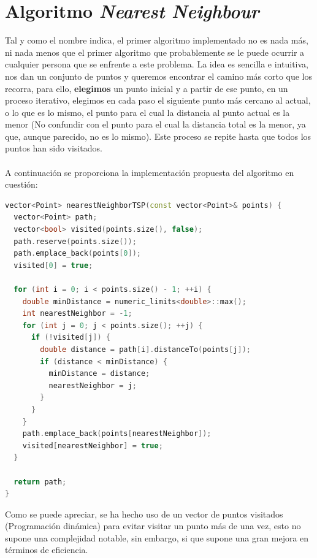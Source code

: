 \documentclass[11pt,openany]{book}
\begin{document}
\section{Algoritmo \textit{Nearest Neighbour}}
Tal y como el nombre indica, el primer algoritmo implementado no es nada más, ni 
nada menos que el primer algoritmo que probablemente se le puede ocurrir a cualquier
persona que se enfrente a este problema. La idea es sencilla e intuitiva, nos 
dan un conjunto de puntos y queremos encontrar el camino más corto que los recorra,
para ello, \textbf{elegimos} un punto inicial y a partir de ese punto, en un proceso 
iterativo, elegimos en cada paso el siguiente punto más cercano al actual, o lo que 
es lo mismo, el punto para el cual la distancia al punto actual es la menor (No confundir
con el punto para el cual la distancia total es la menor, ya que, aunque parecido, no es 
lo mismo). Este proceso se repite hasta que todos los puntos han sido visitados.
\\ \\
A continuación se proporciona la implementación propuesta del algoritmo en cuestión:
\begin{lstlisting}[language=C++]
vector<Point> nearestNeighborTSP(const vector<Point>& points) {
  vector<Point> path;
  vector<bool> visited(points.size(), false);
  path.reserve(points.size());
  path.emplace_back(points[0]);
  visited[0] = true;

  for (int i = 0; i < points.size() - 1; ++i) {
    double minDistance = numeric_limits<double>::max();
    int nearestNeighbor = -1;
    for (int j = 0; j < points.size(); ++j) {
      if (!visited[j]) {
        double distance = path[i].distanceTo(points[j]);
        if (distance < minDistance) {
          minDistance = distance;
          nearestNeighbor = j;
        }
      }
    }
    path.emplace_back(points[nearestNeighbor]);
    visited[nearestNeighbor] = true;
  }

  return path;
}
\end{lstlisting}
Como se puede apreciar, se ha hecho uso de un vector de puntos visitados (Programación 
dinámica) para evitar visitar un punto más de una vez, esto no supone una complejidad
notable, sin embargo, si que supone una gran mejora en términos de eficiencia.
\end{document}
